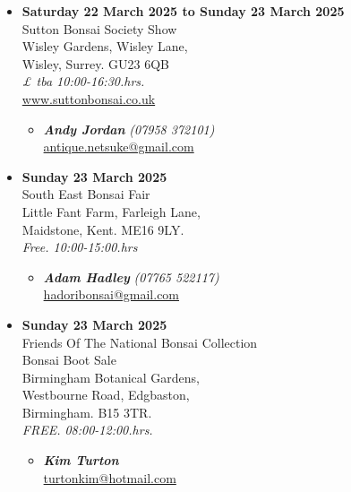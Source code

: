 \begin{itemize}
    \item \textbf{Saturday 22 March 2025 to Sunday 23 March 2025}
    \\
    Sutton Bonsai Society Show \\
    Wisley Gardens, Wisley Lane, \\
    Wisley, Surrey. GU23 6QB
    \\
    \emph{£ tba 10:00-16:30.hrs.}
    \\
    \href{https://www.suttonbonsai.co.uk}{www.suttonbonsai.co.uk}
    \begin{itemize}
        \item \textbf{\emph{Andy Jordan}} \emph{(07958 372101)} \\
        \href{mailto:antique.netsuke@gmail.com}{antique.netsuke@gmail.com} 
    \end{itemize}

    \item \textbf{Sunday 23 March 2025}
    \\
    South East Bonsai Fair \\
    Little Fant Farm, Farleigh Lane, \\
    Maidstone, Kent. ME16 9LY.
    \\
    \emph{Free. 10:00-15:00.hrs}
    \begin{itemize}
        \item \textbf{\emph{Adam Hadley}} \emph{(07765 522117)} \\
        \href{mailto:hadoribonsai@gmail.com}{hadoribonsai@gmail.com} 
    \end{itemize}

    \item \textbf{Sunday 23 March 2025}
    \\
    Friends Of The National Bonsai Collection \\
    Bonsai Boot Sale \\
    Birmingham Botanical Gardens, \\
    Westbourne Road, Edgbaston, \\
    Birmingham. B15 3TR.
    \\
    \emph{FREE. 08:00-12:00.hrs.}
    \begin{itemize}
        \item \textbf{\emph{Kim Turton}} \\
        \href{mailto:turtonkim@hotmail.com}{turtonkim@hotmail.com} 
    \end{itemize}


\end{itemize}

